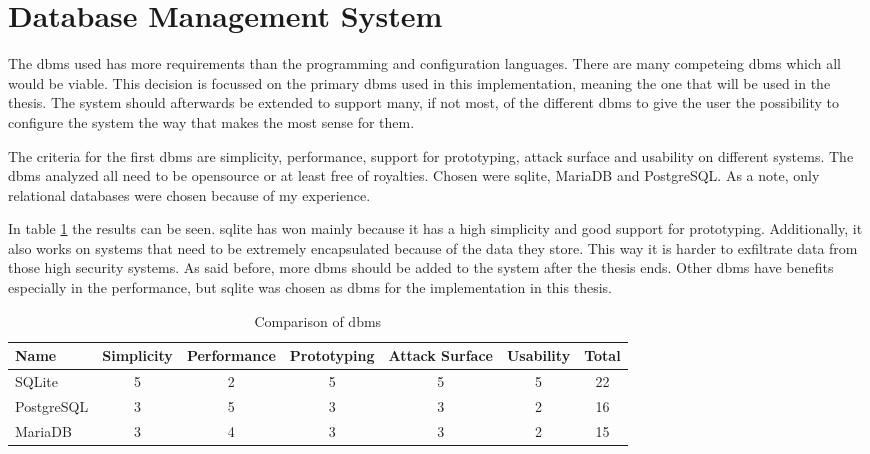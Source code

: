 \section{Database Management System}
\label{sec:decisions:dbms}

The \gls{dbms} used has more requirements than the programming and configuration languages. There are many competeing \gls{dbms} which all would be viable. This decision is focussed on the primary \gls{dbms} used in this implementation, meaning the one that will be used in the thesis. The system should afterwards be extended to support many, if not most, of the different \gls{dbms} to give the user the possibility to configure the system the way that makes the most sense for them. 

The criteria for the first \gls{dbms} are simplicity, performance, support for prototyping, attack surface and usability on different systems. The \gls{dbms} analyzed all need to be \gls{opensource} or at least free of royalties. Chosen were \gls{sqlite}, MariaDB and PostgreSQL. As a note, only relational databases were chosen because of my experience. 

In table \ref{tab:dec:dbms} the results can be seen. \gls{sqlite} has won mainly because it has a high simplicity and good support for prototyping. Additionally, it also works on systems that need to be extremely encapsulated because of the data they store. This way it is harder to exfiltrate data from those high security systems. As said before, more \gls{dbms} should be added to the system after the thesis ends. Other \gls{dbms} have benefits especially in the performance, but \gls{sqlite} was chosen as dbms for the implementation in this thesis.

\begin{table}[!ht]
    \begin{center}
        \caption{Comparison of \gls{dbms}}
        \label{tab:dec:dbms}
        \begin{tabular}{l|c|c|c|c|c|c}
            \textbf{Name} & \textbf{Simplicity} & \textbf{Performance} & \textbf{Prototyping} & \textbf{Attack Surface} & \textbf{Usability} & \textbf{Total}\\
        \hline
            SQLite      & 5 & 2 & 5 & 5 & 5 & 22 \\
            PostgreSQL  & 3 & 5 & 3 & 3 & 2 & 16 \\
            MariaDB     & 3 & 4 & 3 & 3 & 2 & 15 \\
        \end{tabular}
    \end{center}
\end{table}

